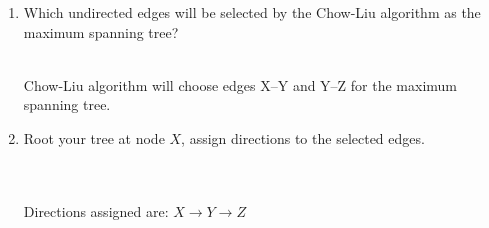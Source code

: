 \documentclass[a4paper]{article}
\theoremstyle{definition}
\newenvironment{soln}{
    \leavevmode\color{blue}\ignorespaces
}{}
\begin{document}
\begin{enumerate}
\item Which undirected edges will be selected by the Chow-Liu algorithm as the maximum spanning tree?
\begin{soln}
\\Chow-Liu algorithm will choose edges X--Y and Y--Z for the maximum spanning tree.
\end{soln}



\item Root your tree at node $X$, assign directions to the selected edges.
\begin{soln}
\\ \\ Directions assigned are: 
$ X \rightarrow Y \rightarrow Z $
\end{soln}

\end{enumerate}
\end{document}
